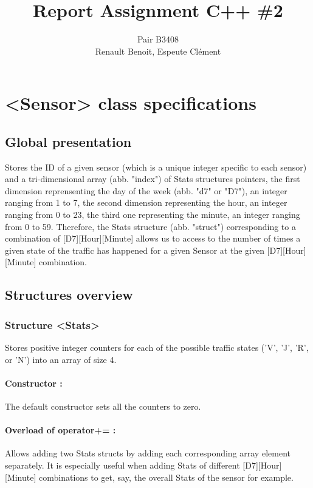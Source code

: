 \documentclass[10pt]{article}
\title{Report Assignment C++ \#2}
\author{Pair B3408 \\ {\sc Renault} Benoit, {\sc Espeute} Clément}
\date{}
\begin{document}
\pagestyle{fancy}
\maketitle

\section{<Sensor> class specifications}
\subsection{Global presentation}
Stores the ID of a given sensor (which is a unique integer specific to each sensor) and a tri-dimensional array (abb. "index") of Stats structures pointers, the first dimension reprensenting the day of the week (abb. "d7" or "D7"), an integer ranging from 1 to 7, the second dimension representing the hour, an integer ranging from 0 to 23, the third one representing the minute, an integer ranging from 0 to 59. Therefore, the Stats structure (abb. "struct") corresponding to a combination of [D7][Hour][Minute] allows us to access to the number of times a given state of the traffic has happened for a given Sensor at the given [D7][Hour][Minute] combination.

\subsection{Structures overview}
\subsubsection*{Structure <Stats>}
Stores positive integer counters for each of the possible traffic states ('V', 'J', 'R', or 'N') into an array of size 4.

\paragraph{Constructor :}
The default constructor sets all the counters to zero.

\paragraph{Overload of operator+= :}
Allows adding two Stats structs by adding each corresponding array element separately. It is especially useful when adding Stats of different [D7][Hour][Minute] combinations to get, say, the overall Stats of the sensor for example.
\end{document}
